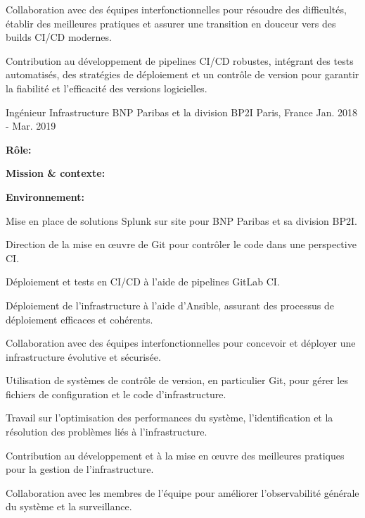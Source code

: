 \begin{cventries}
{\begin{cvitems}
    \item {Collaboration avec des équipes interfonctionnelles pour résoudre des difficultés, établir des meilleures pratiques et assurer une transition en douceur vers des builds CI/CD modernes.}
    \item {Contribution au développement de pipelines CI/CD robustes, intégrant des tests automatisés, des stratégies de déploiement et un contrôle de version pour garantir la fiabilité et l'efficacité des versions logicielles.}
  \end{cvitems}  
}


\cventry
{Ingénieur Infrastructure} %
{BNP Paribas et la division BP2I} %
{Paris, France} %
{Jan. 2018 - Mar. 2019} %
{
  \begin{cvitems} %
    \item {\textbf{Rôle:} }
    \item {\textbf{Mission \& contexte:} }
    \item {\textbf{Environnement:} }
    \item {Mise en place de solutions Splunk sur site pour BNP Paribas et sa division BP2I.}
    \item {Direction de la mise en œuvre de Git pour contrôler le code dans une perspective CI.}
    \item {Déploiement et tests en CI/CD à l'aide de pipelines GitLab CI.}
    \item {Déploiement de l'infrastructure à l'aide d'Ansible, assurant des processus de déploiement efficaces et cohérents.}
    \item {Collaboration avec des équipes interfonctionnelles pour concevoir et déployer une infrastructure évolutive et sécurisée.}
    \item {Utilisation de systèmes de contrôle de version, en particulier Git, pour gérer les fichiers de configuration et le code d'infrastructure.}
    \item {Travail sur l'optimisation des performances du système, l'identification et la résolution des problèmes liés à l'infrastructure.}
    \item {Contribution au développement et à la mise en œuvre des meilleures pratiques pour la gestion de l'infrastructure.}
    \item {Collaboration avec les membres de l'équipe pour améliorer l'observabilité générale du système et la surveillance.}
  \end{cvitems}
}


\end{cventries}
